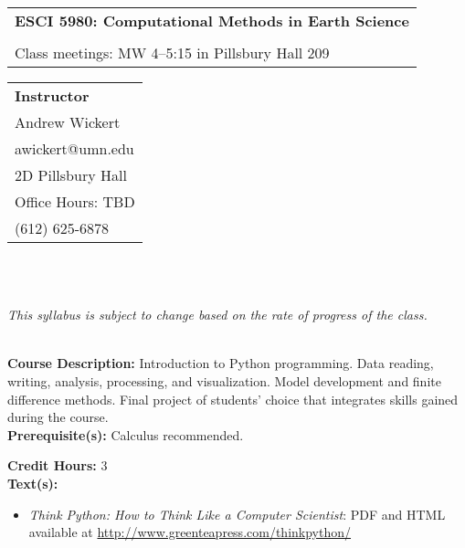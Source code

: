 \documentclass[11pt]{article}
\begin{document}
\noindent\begin{tabular}{ l }
  \bf
  \noindent\LARGE \textbf{ESCI 5980: Computational Methods in Earth Science} \\\\
  \noindent\large Class meetings: MW 4--5:15 in Pillsbury Hall 209 \\
\end{tabular}
\vspace{20pt}

\begin{tabular}{ l }
  \large \textbf{Instructor} \\
  \large Andrew Wickert \\
  \large awickert@umn.edu \\
  \large 2D Pillsbury Hall \\
  \large Office Hours: TBD \\
  \large (612) 625-6878 \\
\end{tabular} \\
\hphantom{12} \\

\begin{center}
\textit{This syllabus is subject to change based on the rate of progress of the class.}
\end{center}

\noindent\textbf {\large \\ Course Description:} Introduction to Python programming. Data reading, writing, analysis, processing, and visualization. Model development and finite difference methods. Final project of students’ choice that integrates skills gained during the course. \\
\noindent\textbf{Prerequisite(s):} Calculus recommended.


\noindent\textbf {Credit Hours:} 3\\

\noindent\textbf {\large Text(s):}

\begin{itemize}
\item \noindent \emph{Think Python: How to Think Like a Computer Scientist}: PDF and HTML available at \url{http://www.greenteapress.com/thinkpython/}
\end{itemize}
\end{document}
